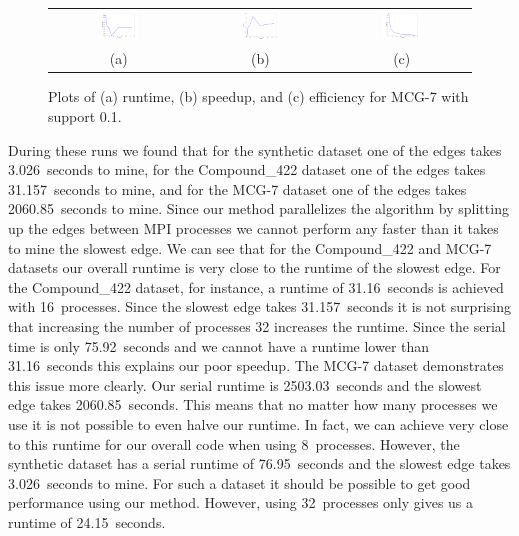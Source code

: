 \begin{figure}[H]
\centering
\begin{tabular}{ccc}
\includegraphics[width=0.3\textwidth]{mcg7_time.png} &
\includegraphics[width=0.3\textwidth]{mcg7_speedup.png} &
\includegraphics[width=0.3\textwidth]{mcg7_efficiency.png} \\
(a) & (b) & (c) \\
\end{tabular}
\caption{Plots of (a) runtime, (b) speedup, and (c) efficiency for
         MCG-7 with support 0.1.}
\label{fig:mcg7}
\end{figure}


During these runs we found that
for the synthetic dataset one of the edges takes 3.026~seconds to mine,
for the Compound\_422 dataset one of the edges takes 31.157~seconds to mine,
and for the MCG-7 dataset one of the edges takes 2060.85~seconds to mine.
Since our method parallelizes the algorithm by splitting up the edges between
MPI processes we cannot perform any faster than it takes to
mine the slowest edge.
We can see that for the Compound\_422 and MCG-7 datasets our overall runtime
is very close to the runtime of the slowest edge. For the Compound\_422
dataset, for instance, a runtime of 31.16~seconds is achieved with
16~processes. Since the slowest edge takes 31.157~seconds it is not surprising
that increasing the number of processes 32 increases the runtime. Since the
serial time is only 75.92~seconds and we cannot have a runtime lower than
31.16~seconds this explains our poor speedup.
The MCG-7 dataset demonstrates this issue more clearly. Our serial runtime
is 2503.03~seconds and the slowest edge takes 2060.85~seconds. This means
that no matter how many processes we use it is not possible to even halve
our runtime. In fact, we can achieve very close to this runtime for our
overall code when using 8~processes.
However, the synthetic dataset has a serial runtime of 76.95~seconds and
the slowest edge takes 3.026~seconds to mine. For such a dataset it should
be possible to get good performance using our method. However, using
32~processes only gives us a runtime of 24.15~seconds.

